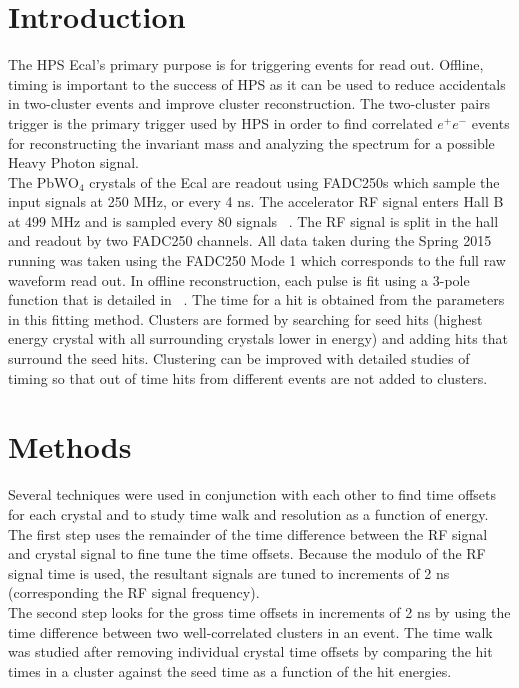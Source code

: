 \documentclass[twoside]{article}
\begin{document}
\begin{multicols}{2} %

\section{Introduction}

The HPS Ecal's primary purpose is for triggering events for read out. Offline, timing is important to the success of HPS as it can be used to reduce accidentals in two-cluster events and improve cluster reconstruction. The two-cluster pairs trigger is the primary trigger used by HPS in order to find correlated $e^+e^-$ events for reconstructing the invariant mass and analyzing the spectrum for a possible Heavy Photon signal.\\ \indent The PbWO$_4$ crystals of the Ecal are readout using FADC250s which sample the input signals at 250 MHz, or every 4 ns. The accelerator RF signal enters Hall B at 499 MHz and is sampled every 80 signals ~\cite{Kazimi}. The RF signal is  split in the hall and readout by two FADC250 channels. All data taken during the Spring 2015 running was taken using the FADC250 Mode 1 which corresponds to the full raw waveform read out. In offline reconstruction, each pulse is fit using a 3-pole function that is detailed in ~\cite{Baltzell}. The time for a hit is obtained from the parameters in this fitting method. Clusters are formed by searching for seed hits (highest energy crystal with all surrounding crystals lower in energy) and adding hits that surround the seed hits. Clustering can be improved with detailed studies of timing so that out of time hits from different events are not added to clusters. 
 

\section{Methods}

Several techniques were used in conjunction with each other to find time offsets for each crystal and to study time walk and resolution as a function of energy.\\ \indent The first step uses the remainder of the time difference between the RF signal and crystal signal to fine tune the time offsets. Because the modulo of the RF signal time is used, the resultant signals are tuned to increments of 2 ns (corresponding the RF signal frequency).\\ \indent The second step looks for the gross time offsets in increments of 2 ns by using the time difference between two well-correlated clusters in an event. The time walk was studied after removing individual crystal time offsets by comparing the hit times in a cluster against the seed time as a function of the hit energies.\\

\end{multicols}
\end{document}
